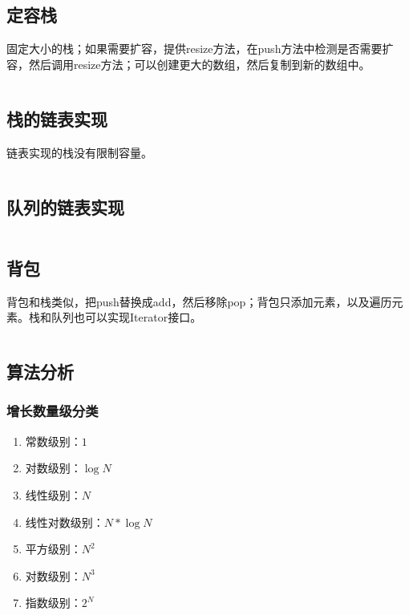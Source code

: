 \documentclass{article}
\begin{document}
  \inputminted{java}{src/chapter01/ArithmeticExpression.java}

  \subsection{定容栈}
  固定大小的栈；如果需要扩容，提供resize方法，在push方法中检测是否需要扩容，然后调用resize方法；可以创建更大的数组，然后复制到新的数组中。

  \inputminted{java}{src/chapter01/FixedCapacityStack.java}

  \subsection{栈的链表实现}
  链表实现的栈没有限制容量。

  \inputminted{java}{src/chapter01/LinkedStack.java}

  \subsection{队列的链表实现}

  \inputminted{java}{src/chapter01/LinkedQueue.java}

  \subsection{背包}
  背包和栈类似，把push替换成add，然后移除pop；背包只添加元素，以及遍历元素。栈和队列也可以实现Iterator接口。

  \inputminted{java}{src/chapter01/Bag.java}

  \subsection{算法分析}
  \subsubsection{增长数量级分类}

  \begin{enumerate}
    \item 常数级别：$1$
    \item 对数级别：$\log N$
    \item 线性级别：$N$
    \item 线性对数级别：$N * \log N$
    \item 平方级别：$N^2$
    \item 对数级别：$N^3$
    \item 指数级别：$2^N$
  \end{enumerate}
\end{document}
